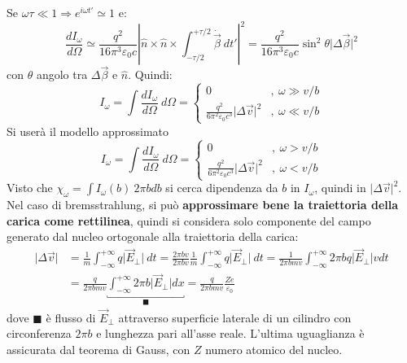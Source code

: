\documentclass[10pt, a4paper]{scrartcl}
\numberwithin{equation}{subsection}
\theoremstyle{style1}
\begin{document}
Se $\omega \tau \ll 1 \Rightarrow e^{i\omega t'} \simeq 1$ e:
\[
\frac{d I_\omega}{d \Omega } \simeq \frac{q^2}{16\pi^3 \varepsilon _0 c} \left\lvert \hat{n}\times \hat{n} \times  \int_{-\tau  / 2} ^{+ \tau / 2} \dot{\vec{\beta }} \ dt' \right\rvert ^2 = \frac{q^2}{16\pi^3 \varepsilon _0 c} \sin^2 \theta  \lvert \Delta  \vec{\beta } \rvert ^2
\] 
con $\theta $ angolo tra $\Delta \vec{\beta }$ e $\hat{n}$. Quindi:
\begin{equation}
	I_\omega = \int \frac{d I_\omega}{d \Omega } \ d\Omega = \begin{cases}
		0& , \ \omega \gg v / b\\
		\displaystyle \frac{q^2}{6 \pi ^2 \varepsilon _0 c^3} \lvert \Delta \vec{v} \rvert ^2 & ,\ \omega \ll v / b
	\end{cases}
\end{equation}
Si user\`a il modello approssimato
\begin{equation}
	I_\omega = \int \frac{d I_\omega}{d \Omega } \ d\Omega = \begin{cases}
		0& , \ \omega > v / b\\
		\displaystyle \frac{q^2}{6 \pi ^2 \varepsilon _0 c^3} \lvert \Delta \vec{v} \rvert ^2 & ,\ \omega < v / b
	\end{cases}
\end{equation}
Visto che $\chi _\omega = \int I_\omega (b)  \ 2\pi b db$ si cerca dipendenza da $b$ in $I_\omega$, quindi in $\lvert \Delta \vec{v} \rvert ^2$. Nel caso di bremsstrahlung, si pu\`o \textbf{approssimare bene la traiettoria della carica come rettilinea}, quindi si considera solo componente del campo generato dal nucleo ortogonale alla traiettoria della carica:
\[
\begin{split}
	\lvert \Delta \vec{v}  \rvert &= \frac{1}{m} \int_{-\infty} ^{+\infty} q \lvert \vec{E}_\perp \rvert  \ dt = \frac{2\pi b v}{2\pi b v} \frac{1}{m} \int_{-\infty} ^{+\infty} q \lvert \vec{E}_\perp \rvert \ dt  = \frac{1}{2 \pi b m v}\int_{-\infty} ^{+\infty} 2\pi b q \lvert \vec{E}_\perp \rvert v dt \\
				      &=\frac{q}{2\pi bmv} \underbracket{\int_{-\infty} ^{+\infty} 2\pi b \lvert \vec{E}_\perp \rvert dx} _{\blacksquare} = \frac{q}{2\pi bmv} \frac{Ze}{\varepsilon _0}
\end{split}
\] 
dove $\blacksquare$ \`e flusso di $\vec{E}_\perp$ attraverso superficie laterale di un cilindro con circonferenza $2\pi b$ e lunghezza pari all'asse reale. L'ultima uguaglianza \`e assicurata dal teorema di Gauss, con $Z$ numero atomico del nucleo.
\end{document}
